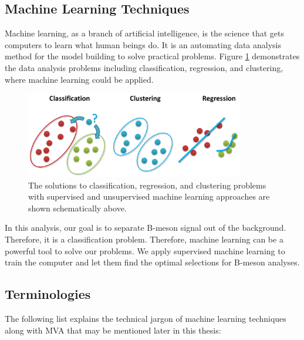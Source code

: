 \subsection{Machine Learning Techniques}

Machine learning, as a branch of artificial intelligence, is the science that gets computers to learn what human beings do. It is an automating data analysis method for the model building to solve practical problems. Figure \ref{MLProblem} demonstrates the data analysis problems including classification, regression, and clustering, where machine learning could be applied.

\begin{figure}[h]
\begin{center}
\includegraphics[width= 0.85\textwidth]{Figures/Chapter5/MLProblemsNew.png}
\caption{The solutions to classification, regression, and clustering problems with supervised and unsupervised machine learning approaches are shown schematically above.}
\label{MLProblem}
\end{center}
\end{figure}

In this analysis, our goal is to separate B-meson signal out of the background. Therefore, it is a classification problem. Therefore, machine learning can be a powerful tool to solve our problems. We apply supervised machine learning to train the computer and let them find the optimal selections for B-meson analyses.   


\subsection{Terminologies}

The following list explains the technical jargon of machine learning techniques along with MVA that may be mentioned later in this thesis:


